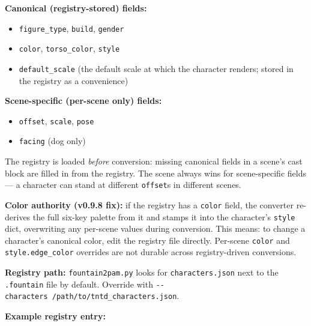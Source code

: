 \documentclass[
  12pt,
  letterpaper,
]{book}
\providecommand{\tightlist}{%
  \setlength{\itemsep}{0pt}\setlength{\parskip}{0pt}}
\begin{document}
\textbf{Canonical (registry-stored) fields:}

\begin{itemize}
\tightlist
\item
  \texttt{figure\_type}, \texttt{build}, \texttt{gender}
\item
  \texttt{color}, \texttt{torso\_color}, \texttt{style}
\item
  \texttt{default\_scale} (the default scale at which the character
  renders; stored in the registry as a convenience)
\end{itemize}

\textbf{Scene-specific (per-scene only) fields:}

\begin{itemize}
\tightlist
\item
  \texttt{offset}, \texttt{scale}, \texttt{pose}
\item
  \texttt{facing} (dog only)
\end{itemize}

The registry is loaded \emph{before} conversion: missing canonical
fields in a scene's cast block are filled in from the registry. The
scene always wins for scene-specific fields --- a character can stand at
different \texttt{offset}s in different scenes.

\textbf{Color authority (v0.9.8 fix):} if the registry has a
\texttt{color} field, the converter re-derives the full six-key palette
from it and stamps it into the character's \texttt{style} dict,
overwriting any per-scene values during conversion. This means: to
change a character's canonical color, edit the registry file directly.
Per-scene \texttt{color} and \texttt{style.edge\_color} overrides are
not durable across registry-driven conversions.

\textbf{Registry path:} \texttt{fountain2pam.py} looks for
\texttt{characters.json} next to the \texttt{.fountain} file by default.
Override with \texttt{-\/-characters\ /path/to/tntd\_characters.json}.

\textbf{Example registry entry:}
\end{document}
